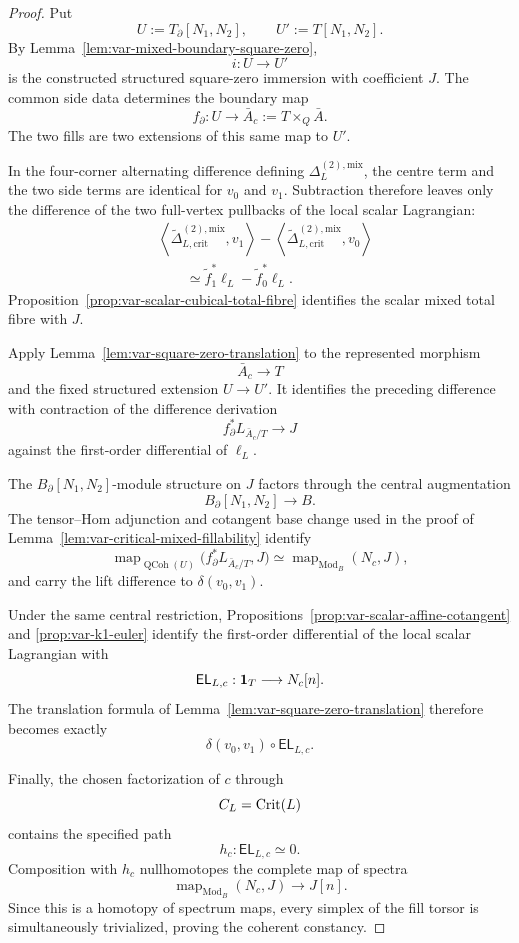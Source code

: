 \begin{proof}
Put
\[
    U:=T_{\partial}[N_1,N_2],
    \qquad
    U':=T[N_1,N_2].
\]
By Lemma~\ref{lem:var-mixed-boundary-square-zero},
\[
    i:U\longrightarrow U'
\]
is the constructed structured square-zero immersion with coefficient \(J\).  The common side data determines the boundary map
\[
    f_{\partial}:U\longrightarrow
    \bar A_c:=T\times_Q\bar A.
\]
The two fills are two extensions of this same map to \(U'\).

In the four-corner alternating difference defining
\(\Delta_L^{(2),\mathrm{mix}}\), the centre term and the two side terms are identical for \(v_0\) and \(v_1\).  Subtraction therefore leaves only the difference of the two full-vertex pullbacks of the local scalar Lagrangian:
\[
\begin{aligned}
    &
    \left\langle
      \widetilde\Delta_{L,\mathrm{crit}}^{(2),\mathrm{mix}},
      v_1
    \right\rangle
    -
    \left\langle
      \widetilde\Delta_{L,\mathrm{crit}}^{(2),\mathrm{mix}},
      v_0
    \right\rangle
    \\
    &\qquad\simeq
    \widetilde f_1^*\ell_L-\widetilde f_0^*\ell_L.
\end{aligned}
\]
Proposition~\ref{prop:var-scalar-cubical-total-fibre} identifies the scalar mixed total fibre with \(J\).

Apply Lemma~\ref{lem:var-square-zero-translation} to the represented morphism
\[
    \bar A_c\longrightarrow T
\]
and the fixed structured extension \(U\to U'\).  It identifies the preceding difference with contraction of the difference derivation
\[
    f_{\partial}^*L_{\bar A_c/T}
    \longrightarrow
    J
\]
against the first-order differential of \(\ell_L\).

The \(B_{\partial}[N_1,N_2]\)-module structure on \(J\) factors through the central augmentation
\[
    B_{\partial}[N_1,N_2]\longrightarrow B.
\]
The tensor--Hom adjunction and cotangent base change used in the proof of Lemma~\ref{lem:var-critical-mixed-fillability} identify
\[
    \operatorname{map}_{\operatorname{QCoh}(U)}
    \bigl(f_{\partial}^*L_{\bar A_c/T},J\bigr)
    \simeq
    \operatorname{map}_{\operatorname{Mod}_B}(N_c,J),
\]
and carry the lift difference to \(\delta(v_0,v_1)\).

Under the same central restriction, Propositions~\ref{prop:var-scalar-affine-cotangent} and \ref{prop:var-k1-euler} identify the first-order differential of the local scalar Lagrangian with
\[
    \mathsf{EL}_{L,c}:
    \mathbf 1_T\longrightarrow N_c[n].
\]
The translation formula of Lemma~\ref{lem:var-square-zero-translation} therefore becomes exactly
\[
    \delta(v_0,v_1)\circ\mathsf{EL}_{L,c}.
\]

Finally, the chosen factorization of \(c\) through
\[
    C_L=\operatorname{Crit}(L)
\]
contains the specified path
\[
    h_c:\mathsf{EL}_{L,c}\simeq0.
\]
Composition with \(h_c\) nullhomotopes the complete map of spectra
\[
    \operatorname{map}_{\operatorname{Mod}_B}(N_c,J)
    \longrightarrow
    J[n].
\]
Since this is a homotopy of spectrum maps, every simplex of the fill torsor is simultaneously trivialized, proving the coherent constancy.
\end{proof}

